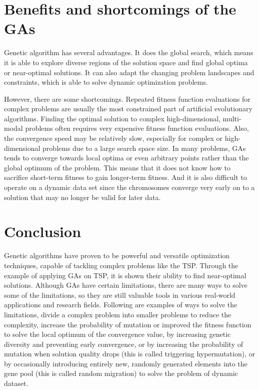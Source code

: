 \documentclass[letterpaper, 12 pt, conference]{ieeeconf}  %
\begin{document}
\section{Benefits and shortcomings of the GAs}
\label{sec:rw}
Genetic algorithm has several advantages. It does the global search, which means it is able to explore diverse regions of the solution space and find global optima or near-optimal solutions. It can also adapt the changing problem landscapes and constraints, which is able to solve dynamic optimization problems.

However, there are some shortcomings. Repeated fitness function evaluations for complex problems are usually the most constrained part of artificial evolutionary algorithms. Finding the optimal solution to complex high-dimensional, multi-modal problems often requires very expensive fitness function evaluations. Also, the convergence speed may be relatively slow, especially for complex or high-dimensional problems due to a large search space size. In many problems, GAs tends to converge towards local optima or even arbitrary points rather than the global optimum of the problem. This means that it does not know how to sacrifice short-term fitness to gain longer-term fitness. And it is also difficult to operate on a dynamic data set since the chromosomes converge very early on to a solution that may no longer be valid for later data. \cite{wikiga}

\section{Conclusion}

Genetic algorithms have proven to be powerful and versatile optimization techniques, capable of tackling complex problems like the TSP. Through the example of applying GAs on TSP, it is shown their ability to find near-optimal solutions. Although GAs have certain limitations, there are many ways to solve some of the limitations, so they are still valuable tools in various real-world applications and research fields. Following are examples of ways to solve the limitations, divide a complex problem into smaller problems to reduce the complexity, increase the probability of mutation or improved the fitness function to solve the local optimum of the convergence value, by increasing genetic diversity and preventing early convergence, or by increasing the probability of mutation when solution quality drops (this is called triggering hypermutation), or by occasionally introducing entirely new, randomly generated elements into the gene pool (this is called random migration) to solve the problem of dynamic dataset.\cite{wikiga}

\newpage


\end{document}
